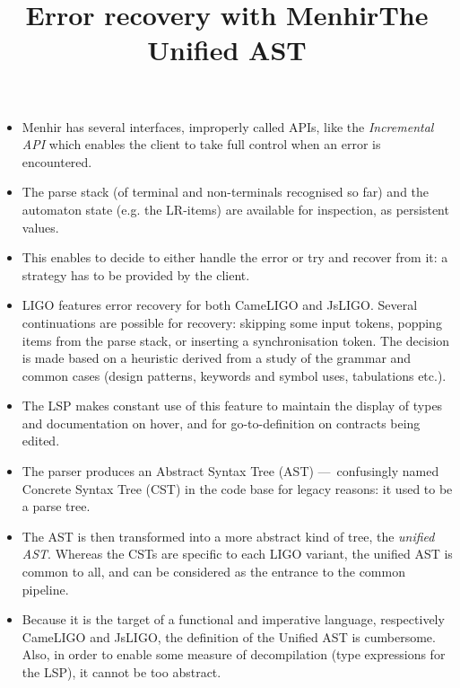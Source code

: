 \documentclass[wide]{slides}
\newcommand{\JsLIGO}[0]{\textsf{JsLIGO}}
\newcommand{\CameLIGO}[0]{\textsf{CameLIGO}}
\newcommand{\Menhir}[0]{\textsf{Menhir}}
\begin{document}
\begin{slide}
  \title{Error recovery with Menhir}

  \begin{itemize}

    \item \Menhir{} has several interfaces, improperly called APIs,
      like the \emph{Incremental API} which enables the client to
      take full control when an error is encountered.

    \item The parse stack (of terminal and non\hyp{}terminals
      recognised so far) and the automaton state (e.g. the
      LR\hyp{}items) are available for inspection, as persistent
      values.

    \item This enables to decide to either handle the error or try and
      recover from it: a strategy has to be provided by the client.

    \item LIGO features error recovery for both \CameLIGO{} and
      \JsLIGO{}. Several continuations are possible for recovery:
      skipping some input tokens, popping items from the parse stack,
      or inserting a synchronisation token. The decision is made based
      on a heuristic derived from a study of the grammar and common
      cases (design patterns, keywords and symbol uses, tabulations
      etc.).

    \item The LSP makes constant use of this feature to maintain the
      display of types and documentation on hover, and for
      go\hyp{}to\hyp{}definition on contracts being edited.

  \end{itemize}
\end{slide}


\begin{slide}
  \title{The Unified AST}

  \begin{itemize}

    \item The parser produces an Abstract Syntax Tree (AST)
      ---~confusingly named Concrete Syntax Tree (CST) in the code
      base for legacy reasons: it used to be a parse tree.

    \item The AST is then transformed into a more abstract kind of
      tree, the \emph{unified AST}. Whereas the CSTs are specific to
      each LIGO variant, the unified AST is common to all, and can be
      considered as the entrance to the common pipeline.

    \item Because it is the target of a functional and imperative
      language, respectively \CameLIGO{} and \JsLIGO{},
      the definition of the Unified AST is cumbersome. Also, in order
      to enable some measure of decompilation (type expressions for
      the LSP), it cannot be too abstract.

  \end{itemize}
\end{slide}
\end{document}
